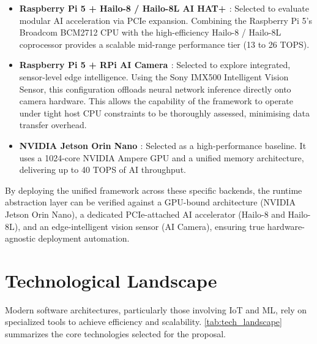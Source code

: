 \begin{itemize}
    \item \textbf{Raspberry Pi 5 \cite{ltdBuyRaspberryPib}  + Hailo-8 \cite{AIAcceleratorHailo8} / Hailo-8L \cite{Hailo8LEntryLevelAIa} \gls{AI} HAT+ \cite{AIHATsRaspberry}}: Selected to evaluate modular \gls{AI} acceleration via \gls{PCIe} expansion. Combining the Raspberry Pi 5's Broadcom BCM2712 CPU with the high-efficiency Hailo-8 / Hailo-8L coprocessor provides a scalable mid-range performance tier (13 to 26 \gls{TOPS}).
    
    \item \textbf{Raspberry Pi 5 \cite{ltdBuyRaspberryPib} + \gls{RPi} \gls{AI} Camera \cite{AICameraRaspberry}}: Selected to explore integrated, sensor-level edge intelligence. Using the Sony IMX500 Intelligent Vision Sensor, this configuration offloads neural network inference directly onto camera hardware. This allows the capability of the framework to operate under tight host \gls{CPU} constraints to be thoroughly assessed, minimising data transfer overhead.
    
    \item \textbf{NVIDIA Jetson Orin Nano \cite{NVIDIAJetsonAGX}}: Selected as a high-performance baseline. It uses a 1024-core NVIDIA Ampere \gls{GPU} and a unified memory architecture, delivering up to 40 \gls{TOPS} of \gls{AI} throughput.
\end{itemize}

By deploying the unified framework across these specific backends, the runtime abstraction layer can be verified against a \gls{GPU}-bound architecture (NVIDIA Jetson Orin Nano), a dedicated \gls{PCIe}-attached \gls{AI} accelerator (Hailo-8 and Hailo-8L), and an edge-intelligent vision sensor (\gls{AI} Camera), ensuring true hardware-agnostic deployment automation.

\section{Technological Landscape}\label{sec:sota:technologies}

Modern software architectures, particularly those involving \gls{IoT} and \gls{ML}, rely on specialized tools to achieve efficiency and scalability. \autoref{tab:tech_landscape} summarizes the core technologies selected for the proposal.

